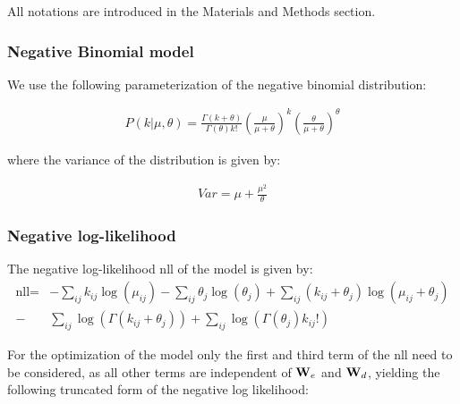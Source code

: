 All notations are introduced in the Materials and Methods section.

\subsubsection*{Negative Binomial model}

We use the following parameterization of the negative binomial distribution:

\begin{align*}
P(k| \mu, \theta) = \frac{\Gamma(k + \theta)}{\Gamma(\theta) k!}  
\left ( \frac{\mu}{\mu + \theta} \right )^{k}
\left ( \frac{\theta}{\mu + \theta} \right)^{\theta} 
\end{align*}

where the variance of the distribution is given by:

\begin{align*}
Var = \mu + \frac{\mu^2}{\theta}
\end{align*}


% 
% 
% 
% 

\subsubsection*{Negative log-likelihood}

The negative log-likelihood $\text{nll}$ of the model is given by:
\begin{align*}
\text{nll}=& -\sum_{ij} k_{ij} \log{(\mu_{ij})} - 
\sum_{ij} \theta_j \log{(\theta_j)} +
\sum_{ij} (k_{ij} + \theta_j) \log{(\mu_{ij} + \theta_j)} \\
-&\sum_{ij} \log{(\Gamma(k_{ij} + \theta_j ))} 
+ \sum_{ij} \log{(\Gamma({\theta_j}) k_{ij}!)}
\end{align*}


For the optimization of the model only the first and third 
term of the $\text{nll}$ need to be considered, as all other terms are independent of 
$\mathbf{W}_e$ and $\mathbf{W}_d$, yielding the following truncated form of the 
negative log likelihood:


